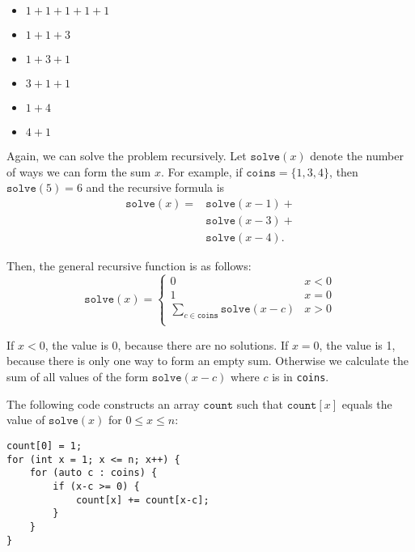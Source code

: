 \begin{multicols}{2}
\begin{itemize}
\item $1+1+1+1+1$
\item $1+1+3$
\item $1+3+1$
\item $3+1+1$
\item $1+4$
\item $4+1$
\end{itemize}
\end{multicols}

Again, we can solve the problem recursively.
Let $\texttt{solve}(x)$ denote the number of ways
we can form the sum $x$.
For example, if $\texttt{coins}=\{1,3,4\}$,
then $\texttt{solve}(5)=6$ and the recursive formula is
\begin{equation*}
\begin{split}
\texttt{solve}(x) = & \texttt{solve}(x-1) + \\
                    & \texttt{solve}(x-3) + \\
                    & \texttt{solve}(x-4)  .
\end{split}
\end{equation*}

Then, the general recursive function is as follows:
\begin{equation*}
    \texttt{solve}(x) = \begin{cases}
               0               & x < 0\\
               1               & x = 0\\
               \sum_{c \in \texttt{coins}} \texttt{solve}(x-c) & x > 0 \\
           \end{cases}
\end{equation*}

If $x<0$, the value is 0, because there are no solutions.
If $x=0$, the value is 1, because there is only one way
to form an empty sum.
Otherwise we calculate the sum of all values
of the form $\texttt{solve}(x-c)$ where $c$ is in \texttt{coins}.

The following code constructs an array
$\texttt{count}$ such that
$\texttt{count}[x]$ equals
the value of $\texttt{solve}(x)$
for $0 \le x \le n$:

\begin{lstlisting}
count[0] = 1;
for (int x = 1; x <= n; x++) {
    for (auto c : coins) {
        if (x-c >= 0) {
            count[x] += count[x-c];
        }
    }
}
\end{lstlisting}

